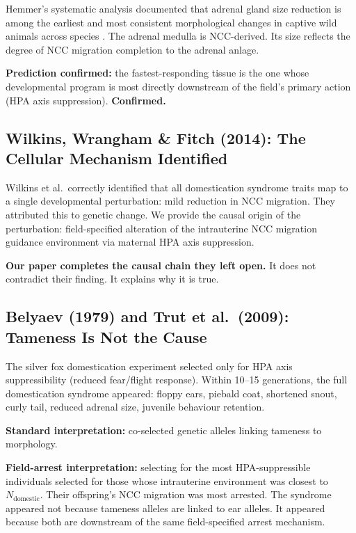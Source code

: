 \documentclass[11pt, a4paper]{article}
\begin{document}
Hemmer's systematic analysis documented that adrenal
gland size reduction is among the earliest and most
consistent morphological changes in captive wild
animals across species \cite{hemmer1990}. The adrenal
medulla is NCC-derived. Its size reflects the degree
of NCC migration completion to the adrenal anlage.

\textbf{Prediction confirmed:} the fastest-responding
tissue is the one whose developmental program is most
directly downstream of the field's primary action
(HPA axis suppression). \textbf{Confirmed.}

\subsection{Wilkins, Wrangham \& Fitch (2014):
The Cellular Mechanism Identified}

Wilkins et al.\ correctly identified that all
domestication syndrome traits map to a single
developmental perturbation: mild reduction in NCC
migration. They attributed this to genetic change.
We provide the causal origin of the perturbation:
field-specified alteration of the intrauterine NCC
migration guidance environment via maternal HPA
axis suppression.

\textbf{Our paper completes the causal chain they
left open.} It does not contradict their finding.
It explains why it is true.

\subsection{Belyaev (1979) and Trut et al.\ (2009):
Tameness Is Not the Cause}

The silver fox domestication experiment selected
only for HPA axis suppressibility (reduced fear/flight
response). Within 10--15 generations, the full
domestication syndrome appeared: floppy ears,
piebald coat, shortened snout, curly tail, reduced
adrenal size, juvenile behaviour retention.

\textbf{Standard interpretation:} co-selected genetic
alleles linking tameness to morphology.

\textbf{Field-arrest interpretation:} selecting for
the most HPA-suppressible individuals selected for
those whose intrauterine environment was closest to
$N_{\text{domestic}}$. Their offspring's NCC migration
was most arrested. The syndrome appeared not because
tameness alleles are linked to ear alleles. It appeared
because both are downstream of the same field-specified
arrest mechanism.
\end{document}

